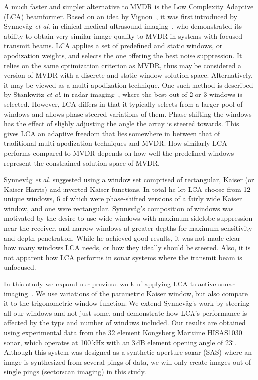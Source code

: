 A much faster and simpler alternative to MVDR is the Low Complexity Adaptive (LCA) beamformer. Based on an idea by Vignon~\cite{Vignon2008}, it was first introduced by Synnev\aa{}g \emph{et al}. in clinical medical ultrasound imaging~\cite{Synnevag2011}, who demonstrated its ability to obtain very similar image quality to MVDR in systems with focused transmit beams. LCA applies a set of predefined and static windows, or apodization weights, and selects the one offering the best noise suppression. It relies on the same optimization criterion as MVDR, thus may be considered a version of MVDR with a discrete and static window solution space. Alternatively, it may be viewed as a multi-apodization technique. One such method is described by Stankwitz \emph{et al}. in radar imaging~\cite{Stankwitz1995}, where the best out of 2 or 3 windows is selected. However, LCA differs in that it typically selects from a larger pool of windows and allows phase-steered variations of them. Phase-shifting the windows has the effect of slighly adjusting the angle the array is steered towards. This gives LCA an adaptive freedom that lies somewhere in between that of traditional multi-apodization techniques and MVDR. How similarly LCA performs compared to MVDR depends on how well the predefined windows represent the constrained solution space of MVDR.


Synnev\aa{}g \emph{et al}. suggested using a window set comprised of rectangular, Kaiser (or Kaiser-Harris) and inverted Kaiser functions. In total he let LCA choose from 12 unique windows, 6 of which were phase-shifted versions of a fairly wide Kaiser window, and one were rectangular. Synnev\aa{}g's composition of windows was motivated by the desire to use wide windows with maximum sidelobe suppression near the receiver, and narrow windows at greater depths for maximum sensitivity and depth penetration. While he achieved good results, it was not made clear how many windows LCA needs, or how they ideally should be steered. Also, it is not apparent how LCA performs in sonar systems where the transmit beam is unfocused.

In this study we expand our previous work of applying LCA to active sonar imaging~\cite{Buskenes2011}. We use variations of the parametric Kaiser window, but also compare it to the trigonometric window function. We extend Synnev\aa{}g's work by steering all our windows and not just some, and demonstrate how LCA's performance is affected by the type and number of windows included. Our results are obtained using experimental data from the 32 element Kongsberg Maritime HISAS1030 sonar, which operates at 100\,kHz with an \minus{}3\,dB element opening angle of 23$^\circ$. Although this system was designed as a synthetic aperture sonar (SAS) where an image is synthesized from several pings of data, we will only create images out of single pings (sectorscan imaging) in this study.

